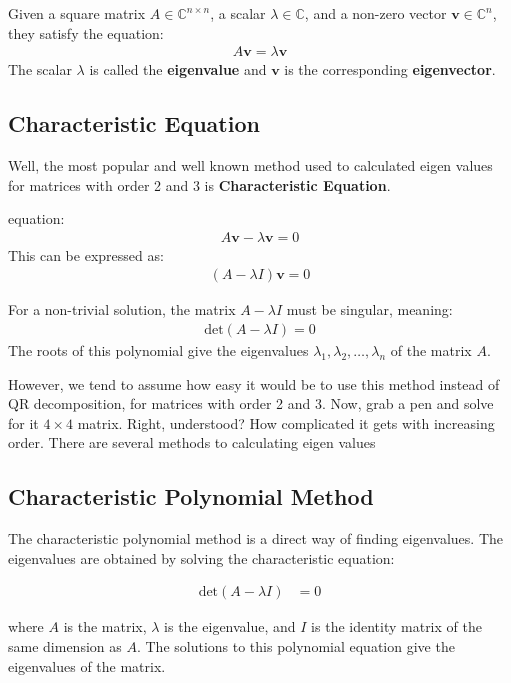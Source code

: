 \documentclass[article]{IEEEtran}
\numberwithin{equation}{enumi}
\numberwithin{figure}{enumi}
\begin{document}
Given a square matrix $ A \in \mathbb{C}^{n \times n} $, a scalar $ \lambda \in \mathbb{C} $, and a non-zero vector $ \mathbf{v} \in \mathbb{C}^n $, they satisfy the equation:
\begin{align*}
\boxed{A \mathbf{v} = \lambda \mathbf{v}}
\end{align*}
The scalar $ \lambda $ is called the \textbf{eigenvalue} and $ \mathbf{v} $ is the corresponding \textbf{eigenvector}.

\subsection{Characteristic Equation}

Well, the most popular and well known method used to calculated eigen values for matrices with order 2 and 3 is \textbf{Characteristic Equation}. 

equation:
\begin{align*}
\boxed{A \mathbf{v} - \lambda \mathbf{v} = 0}
\end{align*}
This can be expressed as:
\begin{align*}
\boxed{(A - \lambda I) \mathbf{v} = 0}
\end{align*}

For a non-trivial solution, the matrix $ A - \lambda I $ must be singular, meaning:
\begin{align*}
\boxed{\text{det}(A - \lambda I) = 0}
\end{align*}
The roots of this polynomial give the eigenvalues $ \lambda_1, \lambda_2, \dots, \lambda_n $ of the matrix $ A $.

However, we tend to assume how easy it would be to use this method instead of QR decomposition, for matrices with order 2 and 3. 
Now, grab a pen and solve for it $4 \times 4$ matrix. 
Right, understood? How complicated it gets with increasing order. 
There are several methods to calculating eigen values
\subsection{Characteristic Polynomial Method}
The characteristic polynomial method is a direct way of finding eigenvalues. The eigenvalues are obtained by solving the characteristic equation:

\begin{align*}
\text{det}(A - \lambda I) &= 0
\end{align*}

where $A$ is the matrix, $\lambda$ is the eigenvalue, and $I$ is the identity matrix of the same dimension as $A$. The solutions to this polynomial equation give the eigenvalues of the matrix.
\end{document}

